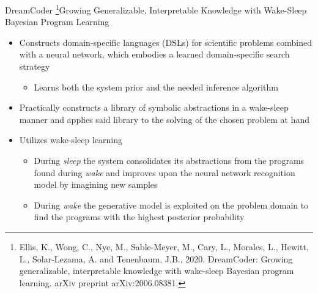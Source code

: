 \documentclass[AERbeamer%
              ,optEnglish%
              ,optBiber%
              ,optBibstyleAlphabetic%
              ,optBeamerClassicFormat%
              ]{AERlatex}%
\begin{document}
\begin{frame}[c]{DreamCoder \footnote{Ellis, K., Wong, C., Nye, M., Sable-Meyer, M., Cary, L., Morales, L., Hewitt, L., Solar-Lezama, A. and Tenenbaum, J.B., 2020. DreamCoder: Growing generalizable, interpretable knowledge with wake-sleep Bayesian program learning. arXiv preprint arXiv:2006.08381.}}{Growing Generalizable, Interpretable Knowledge with Wake-Sleep Bayesian Program Learning}
    \centering
    \begin{itemize}
        \item Constructs domain-specific languages (DSLs) for scientific problems combined with a neural network,
              which embodies a learned domain-specific search strategy
        \begin{itemize}
            \item Learns both the system prior and the needed inference algorithm
        \end{itemize}
        \item Practically constructs a library of symbolic abstractions in a wake-sleep manner and applies said library
              to the solving of the chosen problem at hand
        \item Utilizes wake-sleep learning %
        \begin{itemize}
            \item During \textit{sleep} the system consolidates its abstractions from the programs found during \textit{wake}
                  and improves upon the neural network recognition model by imagining new samples
            \item During \textit{wake} the generative model is exploited on the problem domain to find the programs with the
                  highest posterior probability
        \end{itemize}
    \end{itemize}
\end{frame}
\end{document}
